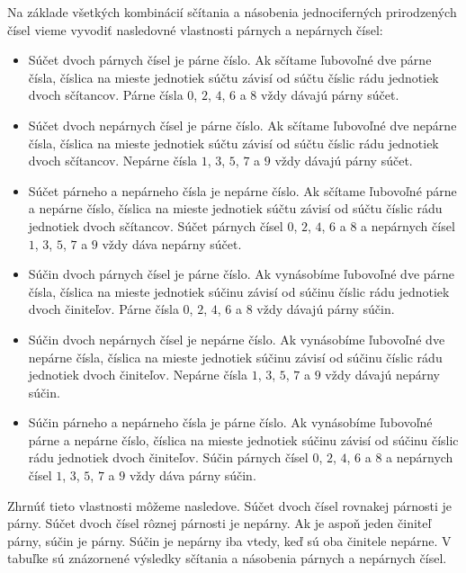 \documentclass{article}
\begin{document}
Na základe všetkých kombinácií sčítania a násobenia jednociferných prirodzených čísel vieme vyvodiť nasledovné vlastnosti párnych a nepárnych čísel:
\begin{itemize}
  \item Súčet dvoch párnych čísel je párne číslo. Ak sčítame ľubovoľné dve párne čísla, číslica na mieste jednotiek súčtu závisí od súčtu číslic rádu jednotiek dvoch sčítancov. Párne čísla \(0\), \(2\), \(4\), \(6\) a \(8\) vždy dávajú párny súčet.
  \item Súčet dvoch nepárnych čísel je párne číslo. Ak sčítame ľubovoľné dve nepárne čísla, číslica na mieste jednotiek súčtu závisí od súčtu číslic rádu jednotiek dvoch sčítancov. Nepárne čísla \(1\), \(3\), \(5\), \(7\) a \(9\) vždy dávajú párny súčet.
  \item Súčet párneho a nepárneho čísla je nepárne číslo. Ak sčítame ľubovoľné párne a nepárne číslo, číslica na mieste jednotiek súčtu závisí od súčtu číslic rádu jednotiek dvoch sčítancov. Súčet párnych čísel \(0\), \(2\), \(4\), \(6\) a \(8\) a nepárnych čísel \(1\), \(3\), \(5\), \(7\) a \(9\) vždy dáva nepárny súčet.
  \item Súčin dvoch párnych čísel je párne číslo. Ak vynásobíme ľubovoľné dve párne čísla, číslica na mieste jednotiek súčinu závisí od súčinu číslic rádu jednotiek dvoch činiteľov. Párne čísla \(0\), \(2\), \(4\), \(6\) a \(8\) vždy dávajú párny súčin.
  \item Súčin dvoch nepárnych čísel je nepárne číslo. Ak vynásobíme ľubovoľné dve nepárne čísla, číslica na mieste jednotiek súčinu závisí od súčinu číslic rádu jednotiek dvoch činiteľov. Nepárne čísla \(1\), \(3\), \(5\), \(7\) a \(9\) vždy dávajú nepárny súčin.
  \item Súčin párneho a nepárneho čísla je párne číslo. Ak vynásobíme ľubovoľné párne a nepárne číslo, číslica na mieste jednotiek súčinu závisí od súčinu číslic rádu jednotiek dvoch činiteľov. Súčin párnych čísel \(0\), \(2\), \(4\), \(6\) a \(8\) a nepárnych čísel \(1\), \(3\), \(5\), \(7\) a \(9\) vždy dáva párny súčin.
\end{itemize}
Zhrnúť tieto vlastnosti môžeme nasledove. Súčet dvoch čísel rovnakej párnosti je párny. Súčet dvoch čísel rôznej párnosti je nepárny. Ak je aspoň jeden činiteľ párny, súčin je párny. Súčin je nepárny iba vtedy, keď sú oba činitele nepárne. V tabuľke sú znázornené výsledky sčítania a násobenia párnych a nepárnych čísel.
\end{document}
